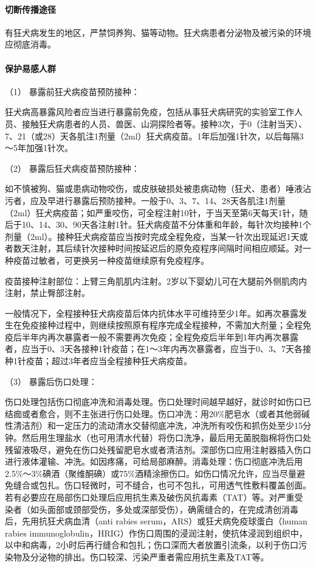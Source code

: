 \paragraph{切断传播途径}

有狂犬病发生的地区，严禁饲养狗、猫等动物。狂犬病患者分泌物及被污染的环境应彻底消毒。

\paragraph{保护易感人群}

\hypertarget{text00221.htmlux5cux23CHP7-6-3-2-3-1}{}
（1） 暴露前狂犬病疫苗预防接种：

狂犬病高暴露风险者应当进行暴露前免疫，包括从事狂犬病研究的实验室工作人员、接触狂犬病患者的人员、兽医、山洞探险者等。接种3次，于0（注射当天）、7、21（或28）天各肌注1剂量（2ml）狂犬病疫苗。1年后加强1针次，以后每隔3～5年加强1针次。

\hypertarget{text00221.htmlux5cux23CHP7-6-3-2-3-2}{}
（2） 暴露后狂犬病疫苗预防接种：

如不慎被狗、猫或患病动物咬伤，或皮肤破损处被患病动物（狂犬、患者）唾液沾污者，应及早进行暴露后预防接种。一般于0、3、7、14、28天各肌注1剂量（2ml）狂犬病疫苗；如严重咬伤，可全程注射10针，于当天至第6天每天1针，随后于10、14、30、90天各注射1针。狂犬病疫苗不分体重和年龄，每针次均接种1个剂量（2ml）。接种狂犬病疫苗应当按时完成全程免疫，当某一针次出现延迟1天或者数天注射，其后续针次接种时间按延迟后的原免疫程序间隔时间相应顺延。对一种疫苗过敏者，可更换另一种疫苗继续原有免疫程序。

疫苗接种注射部位：上臂三角肌肌内注射。2岁以下婴幼儿可在大腿前外侧肌肉内注射，禁止臀部注射。

一般情况下，全程接种狂犬病疫苗后体内抗体水平可维持至少1年。如再次暴露发生在免疫接种过程中，则继续按照原有程序完成全程接种，不需加大剂量；全程免疫后半年内再次暴露者一般不需要再次免疫；全程免疫后半年到1年内再次暴露者，应当于0、3天各接种1针疫苗；在1～3年内再次暴露者，应当于0、3、7天各接种1针疫苗；超过3年者应当全程接种狂犬病疫苗。

\hypertarget{text00221.htmlux5cux23CHP7-6-3-2-3-3}{}
（3） 暴露后伤口处理：

伤口处理包括伤口彻底冲洗和消毒处理。伤口处理时间越早越好，就诊时如伤口已结痂或者愈合，则不主张进行伤口处理。伤口冲洗：用20\%肥皂水（或者其他弱碱性清洁剂）和一定压力的流动清水交替彻底冲洗，冲洗所有咬伤和抓伤处至少15分钟。然后用生理盐水（也可用清水代替）将伤口洗净，最后用无菌脱脂棉将伤口处残留液吸尽，避免在伤口处残留肥皂水或者清洁剂。深部伤口应用注射器插入伤口进行液体灌输、冲洗。如因疼痛，可给局部麻醉。消毒处理：伤口彻底冲洗后用2.5\%～3\%碘酒（聚维酮碘）或75\%酒精涂擦伤口。如伤口情况允许，应当尽量避免缝合或包扎。伤口轻微时，可不缝合，也可不包扎，可用透气性敷料覆盖创面。若有必要应在局部伤口处理后应用抗生素及破伤风抗毒素（TAT）等。对严重受染者（如头面部或颈部受伤，多处或深部受伤），确需缝合的，在完成清创消毒后，先用抗狂犬病血清（anti
rabies serum，ARS）或狂犬病免疫球蛋白（human rabies
immunoglobulin，HRIG）作伤口周围的浸润注射，使抗体浸润到组织中，以中和病毒，2小时后再行缝合和包扎；伤口深而大者放置引流条，以利于伤口污染物及分泌物的排出。伤口较深、污染严重者需应用抗生素及TAT等。

